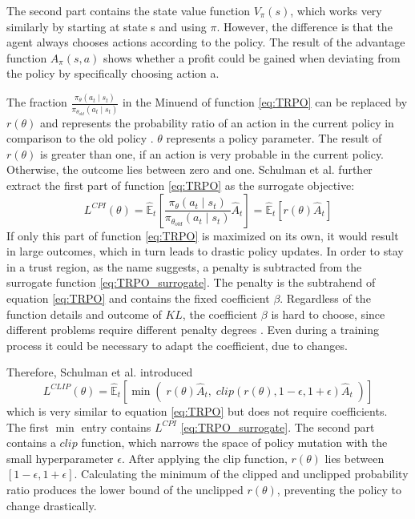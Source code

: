 The second part contains the state value function $V_\pi(s)$, which works very similarly by starting at state s and using $\pi$. However, the difference is that the agent always chooses actions according to the policy. The result of the advantage function $A_\pi(s,a)$ shows whether a profit could be gained when deviating from the policy by specifically choosing action a.

The fraction $\frac{\pi_{\theta}(a_{t} \mid s_{t})}{\pi_{\theta_{old}}(a_{t} \mid s_{t})}$ in the Minuend of function \eqref{eq:TRPO} can be replaced by $r(\theta)$
and represents the probability ratio of an action in the current policy in comparison to the old policy \cite{scwo17}. $\theta$ represents a policy parameter. The result of $r(\theta)$ is greater than one, if an action is very probable in the current policy. Otherwise, the outcome lies between zero and one. Schulman et al. \cite{scwo17} further extract the first part of function \eqref{eq:TRPO} as the surrogate objective:
\begin{equation}\label{eq:TRPO_surrogate}
    L^{CPI}(\theta) = \hat{\mathbb{E}}_{t} \left[ \frac{\pi_{\theta}(a_{t} \mid s_{t})}{\pi_{\theta_{old}}(a_{t} \mid s_{t})} \hat{A}_{t} \right]
    = \hat{\mathbb{E}}_{t} \left[ r(\theta)\hat{A}_{t} \right]
\end{equation}
If only this part of function \eqref{eq:TRPO} is maximized on its own, it would result in large outcomes, which in turn leads to drastic policy updates. In order to stay in a trust region, as the name suggests, a penalty is subtracted from the surrogate function \eqref{eq:TRPO_surrogate}. The penalty is the subtrahend of equation \eqref{eq:TRPO} and contains the fixed coefficient $\beta$. Regardless of the function details and outcome of $KL$, the coefficient $\beta$ is hard to choose, since different problems require different penalty degrees \cite{scwo17}. Even during a training process it could be necessary to adapt the coefficient, due to changes.

Therefore, Schulman et al. introduced
\begin{equation}\label{eq:PPO}
    L^{CLIP}(\theta) = \hat{\mathbb{E}}_{t} \left[ \min \left( \; r(\theta)\hat{A}_{t}, \; clip(r(\theta), 1-\epsilon, 1+\epsilon)\hat{A}_{t} \; \right) \right]
\end{equation}
which is very similar to equation \eqref{eq:TRPO} but does not require coefficients. The first $\min$ entry contains $L^{CPI}$ \eqref{eq:TRPO_surrogate}. The second part contains a $clip$ function, which narrows the space of policy mutation with the small hyperparameter $\epsilon$. After applying the clip function, $r(\theta)$ lies between $[1-\epsilon,1+\epsilon]$. Calculating the minimum of the clipped and unclipped probability ratio produces the lower bound of the unclipped $r(\theta)$, preventing the policy to change drastically.

